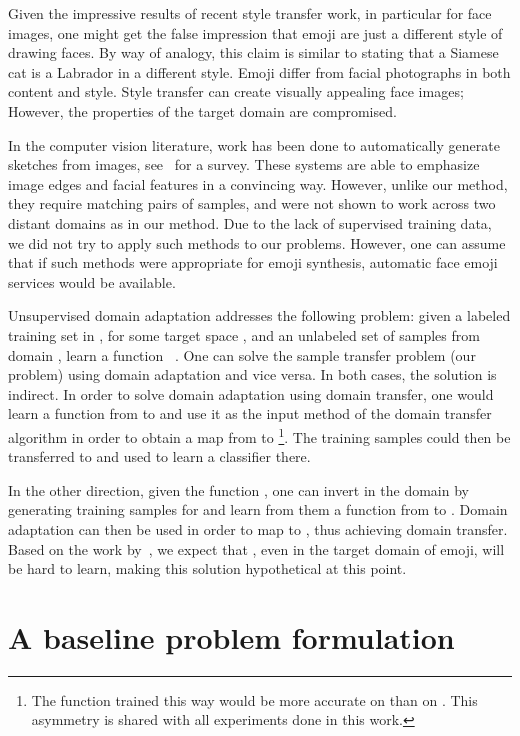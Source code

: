 \documentclass{article} \usepackage{iclr2017_conference,times}
\begin{document}
Given the impressive results of recent style transfer work, in particular for face images, one might get the false impression that emoji are just a different style of drawing faces. By way of analogy, this claim is similar to stating that a Siamese cat is a Labrador in a different style. Emoji differ from facial photographs in both content and style. Style transfer can create visually appealing face images; However, the  properties of the target domain are compromised. 

In the computer vision literature, work has been done to automatically generate sketches from images, see~\citet{6243138} for a survey. These systems are able to emphasize image edges and facial features in a convincing way. However, unlike our method, they require matching pairs of samples, and were not shown to work across two distant domains as in our method. Due to the lack of supervised training data, we did not try to apply such methods to our problems. However, one can assume that if such methods were appropriate for emoji synthesis, automatic face emoji services would be available.

Unsupervised domain adaptation addresses the following problem: given a labeled training set in , for some target space , and an unlabeled set of samples from domain , learn a function ~\citep{ICML2012Chen_416,domaingan}. One can solve the sample transfer problem (our problem) using domain adaptation and vice versa. In both cases, the solution is indirect. In order to solve domain adaptation using domain transfer, one would learn a function from  to  and use it as the input method of the domain transfer algorithm in order to obtain a map from  to \footnote{The function trained this way would be more accurate on  than on . This asymmetry is shared with all experiments done in this work.}. The training samples could then be transferred to  and used to learn a classifier there. 

In the other direction, given the function , one can invert  in the domain  by generating training samples  for  and learn from them a function  from  to . Domain adaptation can then be used in order to map  to , thus achieving domain transfer.  Based on the work by~\citet{googlesomething}, we expect that , even in the target domain of emoji, will be hard to learn, making this solution hypothetical at this point.

\section{A baseline problem formulation}
\label{sec:baseline}
\end{document}
